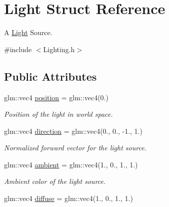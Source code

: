 \hypertarget{struct_light}{}\section{Light Struct Reference}
\label{struct_light}


A \mbox{\hyperlink{struct_light}{Light}} Source.  




{\ttfamily \#include $<$Lighting.\+h$>$}

\subsection*{Public Attributes}
\begin{DoxyCompactItemize}
\item 
\mbox{\label{struct_light_a240653e7032ae5e2e1fbbab819422077}} 
glm\+::vec4 \mbox{\hyperlink{struct_light_a240653e7032ae5e2e1fbbab819422077}{position}} = glm\+::vec4(0.)
\begin{DoxyCompactList}\small\item\em Position of the light in world space. \end{DoxyCompactList}\item 
\mbox{\label{struct_light_a32a17277c70463d464c1bb1af80fb8c8}} 
glm\+::vec4 \mbox{\hyperlink{struct_light_a32a17277c70463d464c1bb1af80fb8c8}{direction}} = glm\+::vec4(0., 0., -\/1., 1.)
\begin{DoxyCompactList}\small\item\em Normalized forward vector for the light source. \end{DoxyCompactList}\item 
\mbox{\label{struct_light_abcd118cea5b6bb284d218b1df62bbbce}} 
glm\+::vec4 \mbox{\hyperlink{struct_light_abcd118cea5b6bb284d218b1df62bbbce}{ambient}} = glm\+::vec4(1., 0., 1., 1.)
\begin{DoxyCompactList}\small\item\em Ambient color of the light source. \end{DoxyCompactList}\item 
\mbox{\label{struct_light_af933e4c1087a91fa621fa9f28ccf3e76}} 
glm\+::vec4 \mbox{\hyperlink{struct_light_af933e4c1087a91fa621fa9f28ccf3e76}{diffuse}} = glm\+::vec4(1., 0., 1., 1.)

\end{DoxyCompactItemize}
